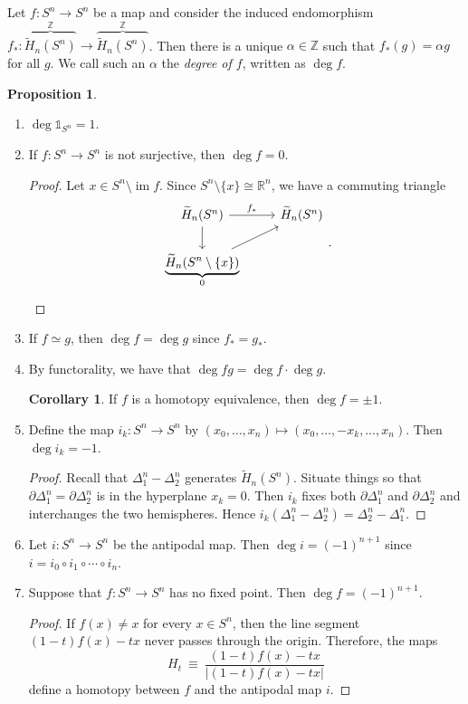 \documentclass[10pt,letterpaper,cm]{nupset}
\theoremstyle{definition}
\theoremstyle{theorem}
\newtheorem{prop}[definition]{Proposition}
\newtheorem{corollary}[definition]{Corollary}
\theoremstyle{remark}
\newcommand{\R}{\mathbb{R}}
\newcommand{\Z}{\mathbb Z}
\newcommand{\1}{\mathbb{1}}
\newcommand{\0}{\vec 0}
\DeclareMathOperator{\im}{im}
\begin{document}
\medskip

Let $f: S^n \to S^n$ be a map and consider the induced endomorphism $f_{\ast} : \overbrace{\widetilde{H}_n(S^n)}^{\Z} \longrightarrow  \overbrace{\widetilde{H}_n(S^n)}^{\Z} $. Then there is a unique $\alpha \in \Z$  such that $f_{\ast}(g) = \alpha g$ for all $g$. We call such an $\alpha$ the \textit{degree of $f$}, written as $\deg{f}$.

\begin{prop} $ $
\begin{enumerate}
\item $\deg{\1_{S^n}}=1$.
\item If $f: S^n \to S^n$ is not surjective, then $\deg{f} = 0$.
\begin{proof}
Let $x\in S^n \setminus \im{f}$. Since $S^n \setminus \{x\} \cong \R^n$, we have a commuting triangle
\[
\begin{tikzcd}
\widetilde{H}_n(S^n) \arrow[r, "f_{\ast}"] \arrow[d] & \widetilde{H}_n(S^n) \\
\underbrace{\widetilde{H}_n(S^n \setminus \{x\})}_{0} \arrow[ru]      &                     
\end{tikzcd}
.\]
\end{proof}
\item If $f \simeq g$, then $\deg{f} = \deg{g}$ since $f_{\ast} = g_{\ast}$.
\item By functorality, we have that $\deg{fg}= \deg{f}\cdot \deg{g}$.
\begin{corollary}
If $f$ is a homotopy equivalence, then $\deg{f}= \pm 1$.
\end{corollary}
\item Define the map $i_k : S^n \to S^n$ by $\left(x_0, \ldots, x_n\right) \mapsto \left(x_0, \ldots, {-x_k}, \ldots, x_n\right)$. Then $\deg{i_k} = {-1}$.
\begin{proof}
Recall that $\Delta_1^n -\Delta_2^n$ generates $\widetilde{H}_n(S^n)$. Situate things so that $\partial{\Delta_1^n} = \partial{\Delta_2^n}$ is in the hyperplane $x_k=0$. Then $i_k$ fixes both $\partial{\Delta_1^n}$ and $\partial{\Delta_2^n}$ and interchanges the two hemispheres. Hence $i_k(\Delta_1^n -\Delta_2^n)= \Delta_2^n- \Delta_1^n $.
\end{proof}
\item Let $i: S^n \to S^n$ be the antipodal map. Then $\deg{i} = \left({-1}\right)^{n+1}$ since $i= i_0 \circ i_1 \circ \cdots \circ i_n$.
\item Suppose that $f: S^n \to S^n$ has no fixed point. Then $\deg{f}= \left({-1}\right)^{n+1}$.
\begin{proof}
If $f(x) \ne x$ for every $x\in S^n$, then the line segment $\left(1-t\right)f(x) - tx$ never passes through the origin. Therefore, the maps $$H_t \  \equiv \  \frac{ \left(1-t\right)f(x)-tx  }{\left\lvert{\left(1-t\right)f(x) -tx}\right\rvert     }$$ define a homotopy between $f$ and the antipodal map $i$.
\end{proof}
\end{enumerate}
\end{prop}
\end{document}
